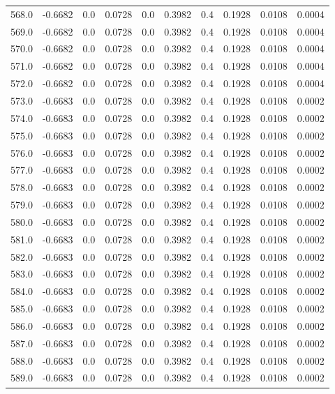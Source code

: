 \begin{longtable}{lrrrrrrrrr}
568.0 & -0.6682 & 0.0 & 0.0728 & 0.0 & 0.3982 & 0.4 & 0.1928 & 0.0108 & 0.0004 \\
569.0 & -0.6682 & 0.0 & 0.0728 & 0.0 & 0.3982 & 0.4 & 0.1928 & 0.0108 & 0.0004 \\
570.0 & -0.6682 & 0.0 & 0.0728 & 0.0 & 0.3982 & 0.4 & 0.1928 & 0.0108 & 0.0004 \\
571.0 & -0.6682 & 0.0 & 0.0728 & 0.0 & 0.3982 & 0.4 & 0.1928 & 0.0108 & 0.0004 \\
572.0 & -0.6682 & 0.0 & 0.0728 & 0.0 & 0.3982 & 0.4 & 0.1928 & 0.0108 & 0.0004 \\
573.0 & -0.6683 & 0.0 & 0.0728 & 0.0 & 0.3982 & 0.4 & 0.1928 & 0.0108 & 0.0002 \\
574.0 & -0.6683 & 0.0 & 0.0728 & 0.0 & 0.3982 & 0.4 & 0.1928 & 0.0108 & 0.0002 \\
575.0 & -0.6683 & 0.0 & 0.0728 & 0.0 & 0.3982 & 0.4 & 0.1928 & 0.0108 & 0.0002 \\
576.0 & -0.6683 & 0.0 & 0.0728 & 0.0 & 0.3982 & 0.4 & 0.1928 & 0.0108 & 0.0002 \\
577.0 & -0.6683 & 0.0 & 0.0728 & 0.0 & 0.3982 & 0.4 & 0.1928 & 0.0108 & 0.0002 \\
578.0 & -0.6683 & 0.0 & 0.0728 & 0.0 & 0.3982 & 0.4 & 0.1928 & 0.0108 & 0.0002 \\
579.0 & -0.6683 & 0.0 & 0.0728 & 0.0 & 0.3982 & 0.4 & 0.1928 & 0.0108 & 0.0002 \\
580.0 & -0.6683 & 0.0 & 0.0728 & 0.0 & 0.3982 & 0.4 & 0.1928 & 0.0108 & 0.0002 \\
581.0 & -0.6683 & 0.0 & 0.0728 & 0.0 & 0.3982 & 0.4 & 0.1928 & 0.0108 & 0.0002 \\
582.0 & -0.6683 & 0.0 & 0.0728 & 0.0 & 0.3982 & 0.4 & 0.1928 & 0.0108 & 0.0002 \\
583.0 & -0.6683 & 0.0 & 0.0728 & 0.0 & 0.3982 & 0.4 & 0.1928 & 0.0108 & 0.0002 \\
584.0 & -0.6683 & 0.0 & 0.0728 & 0.0 & 0.3982 & 0.4 & 0.1928 & 0.0108 & 0.0002 \\
585.0 & -0.6683 & 0.0 & 0.0728 & 0.0 & 0.3982 & 0.4 & 0.1928 & 0.0108 & 0.0002 \\
586.0 & -0.6683 & 0.0 & 0.0728 & 0.0 & 0.3982 & 0.4 & 0.1928 & 0.0108 & 0.0002 \\
587.0 & -0.6683 & 0.0 & 0.0728 & 0.0 & 0.3982 & 0.4 & 0.1928 & 0.0108 & 0.0002 \\
588.0 & -0.6683 & 0.0 & 0.0728 & 0.0 & 0.3982 & 0.4 & 0.1928 & 0.0108 & 0.0002 \\
589.0 & -0.6683 & 0.0 & 0.0728 & 0.0 & 0.3982 & 0.4 & 0.1928 & 0.0108 & 0.0002 \\

\end{longtable}
